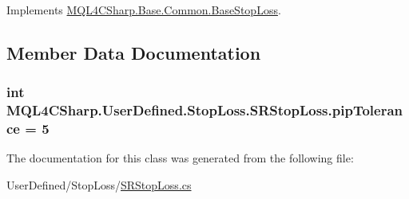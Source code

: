 Implements \hyperlink{class_m_q_l4_c_sharp_1_1_base_1_1_common_1_1_base_stop_loss_ae1d01dadd0a5c0c29adcf5ed31ce509c}{M\+Q\+L4\+C\+Sharp.\+Base.\+Common.\+Base\+Stop\+Loss}.



\subsection{Member Data Documentation}
\subsubsection[{\texorpdfstring{pip\+Tolerance}{pipTolerance}}]{\setlength{\rightskip}{0pt plus 5cm}int M\+Q\+L4\+C\+Sharp.\+User\+Defined.\+Stop\+Loss.\+S\+R\+Stop\+Loss.\+pip\+Tolerance = 5\hspace{0.3cm}{\ttfamily [static]}}\hypertarget{class_m_q_l4_c_sharp_1_1_user_defined_1_1_stop_loss_1_1_s_r_stop_loss_a5bc39c515d36392483ff79b2f00d4495}{}\label{class_m_q_l4_c_sharp_1_1_user_defined_1_1_stop_loss_1_1_s_r_stop_loss_a5bc39c515d36392483ff79b2f00d4495}


The documentation for this class was generated from the following file\+:\begin{DoxyCompactItemize}
\item 
User\+Defined/\+Stop\+Loss/\hyperlink{_s_r_stop_loss_8cs}{S\+R\+Stop\+Loss.\+cs}\end{DoxyCompactItemize}
